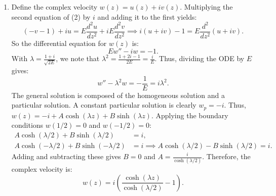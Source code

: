 \documentclass{article}
\begin{document}
\begin{enumerate}[label=\fbox{\arabic*}]
\begin{enumerate}[label=\arabic*.]
          For the first equation, the second derivative transforms as $\frac{d^2 u_*}{dz_*^2} = \frac{1}{D^2} \frac{d^2}{dz^2} \left( \frac{F}{2\Omega} u \right) = \frac{F}{2\Omega D^2} \frac{d^2 u}{dz^2}$.
          Substituting this gives:
          \[
            -2\Omega \left( \frac{F}{2\Omega} v \right) = \nu \left( \frac{F}{2\Omega D^2} \frac{d^2 u}{dz^2} \right) + F.
          \]
          Dividing the entire equation by $F$ yields:
          \[
            -v = \left( \frac{\nu}{2\Omega D^2} \right) \frac{d^2 u}{dz^2} + 1.
          \]
          Similarly, for the second equation:
          \[
            2\Omega \left( \frac{F}{2\Omega} u \right) = \nu \left( \frac{F}{2\Omega D^2} \frac{d^2 v}{dz^2} \right) \implies u = \left( \frac{\nu}{2\Omega D^2} \right) \frac{d^2 v}{dz^2}.
          \]
          The boundary conditions $u_*(\pm D/2) = v_*(\pm D/2) = 0$ directly translate to $u(\pm 1/2) = v(\pm 1/2) = 0$.
          By comparing with (2), we identify the constant $E$ (the Ekman number) as:
          \[
            E = \frac{\nu}{2\Omega D^2}.
          \]

          \item Define the complex velocity $w(z) = u(z) + iv(z)$. Multiplying the second equation of (2) by $i$ and adding it to the first yields:
          \[
            (-v - 1) + iu = E \frac{d^2 u}{dz^2} + i E \frac{d^2 v}{dz^2} \implies i(u + iv) - 1 = E \frac{d^2}{dz^2} (u + iv).
          \]
          So the differential equation for $w(z)$ is:
          \[
            E w'' - iw = -1.
          \]
          With $\lambda = \frac{1+i}{\sqrt{2E}}$, we note that $\lambda^2 = \frac{1+2i-1}{2E} = \frac{i}{E}$. Thus, dividing the ODE by $E$ gives:
          \[
            w'' - \lambda^2 w = -\frac{1}{E} = i \lambda^2.
          \]
          The general solution is composed of the homogeneous solution and a particular solution. A constant particular solution is clearly $w_p = -i$.
          Thus, $w(z) = -i + A \cosh(\lambda z) + B \sinh(\lambda z)$.
          Applying the boundary conditions $w(1/2) = 0$ and $w(-1/2) = 0$:
          \begin{align*}
            A \cosh(\lambda/2) + B \sinh(\lambda/2) &= i, \\
            A \cosh(-\lambda/2) + B \sinh(-\lambda/2) &= i \implies A \cosh(\lambda/2) - B \sinh(\lambda/2) = i.
          \end{align*}
          Adding and subtracting these gives $B = 0$ and $A = \frac{i}{\cosh(\lambda/2)}$.
          Therefore, the complex velocity is:
          \[
            w(z) = i \left( \frac{\cosh(\lambda z)}{\cosh(\lambda/2)} - 1 \right).
          \]


\end{enumerate}
\end{enumerate}
\end{document}

